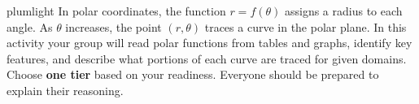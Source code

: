 \documentclass[10pt]{article}
\begin{document}
\namepartnerperiod

\vspace{0.08in}

\begin{scenariobox}{plumlight}
In polar coordinates, the function $r = f(\theta)$ assigns a radius to each angle.
As $\theta$ increases, the point $(r, \theta)$ traces a curve in the polar plane.
In this activity your group will read polar functions from tables and graphs,
identify key features, and describe what portions of each curve are traced for
given domains. Choose \textbf{one tier} based on your readiness. Everyone should
be prepared to explain their reasoning.
\end{scenariobox}

\vspace{0.08in}
\end{document}
